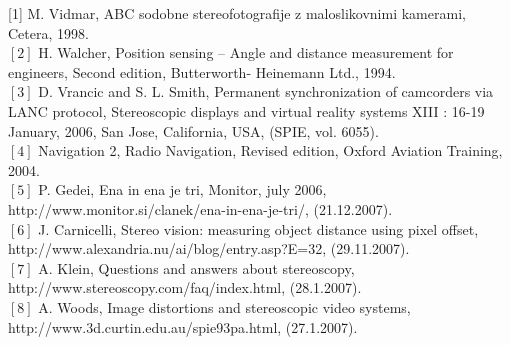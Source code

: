 \begin{thebibliography}{99}

\end{thebibliography}

[1] M. Vidmar, ABC sodobne stereofotografije z maloslikovnimi
kamerami, Cetera, 1998.\\
$[2]$ H. Walcher, Position sensing – Angle and distance
measurement for engineers, Second edition, Butterworth-
Heinemann Ltd., 1994.\\
$[3]$ D. Vrancic and S. L. Smith, Permanent synchronization of
camcorders via LANC protocol, Stereoscopic displays and virtual
reality systems XIII : 16-19 January, 2006, San Jose, California,
USA, (SPIE, vol. 6055).\\
$[4]$ Navigation 2, Radio Navigation, Revised edition, Oxford
Aviation Training, 2004.\\
$[5]$ P. Gedei, Ena in ena je tri, Monitor, july 2006,
http://www.monitor.si/clanek/ena-in-ena-je-tri/, (21.12.2007).\\
$[6]$ J. Carnicelli, Stereo vision: measuring object distance using
pixel offset,\\ http://www.alexandria.nu/ai/blog/entry.asp?E=32,
(29.11.2007).\\
$[7]$ A. Klein, Questions and answers about stereoscopy,\\
http://www.stereoscopy.com/faq/index.html, (28.1.2007).\\
$[8]$ A. Woods, Image distortions and stereoscopic video systems,\\
http://www.3d.curtin.edu.au/spie93pa.html, (27.1.2007).